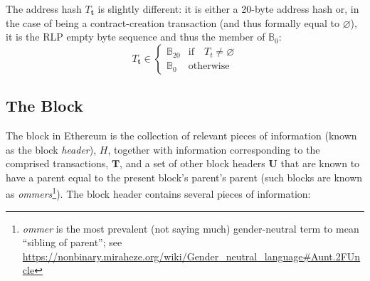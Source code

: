 \documentclass[9pt,oneside]{amsart}
\begin{document}
\begin{multicols}{2}
The address hash $T_\mathbf{t}$ is slightly different: it is either a 20-byte address hash or, in the case of being a contract-creation transaction (and thus formally equal to $\varnothing$), it is the RLP empty byte sequence and thus the member of $\mathbb{B}_0$:
\begin{equation}
T_\mathbf{t} \in \begin{cases} \mathbb{B}_{20} & \text{if} \quad T_t \neq \varnothing \\
\mathbb{B}_{0} & \text{otherwise}\end{cases}
\end{equation}

\subsection{The Block} \label{ch:block}

The block in Ethereum is the collection of relevant pieces of information (known as the block \textit{header}), $H$, together with information corresponding to the comprised transactions, $\mathbf{T}$, and a set of other block headers $\mathbf{U}$ that are known to have a parent equal to the present block's parent's parent (such blocks are known as \textit{ommers}\footnote{\textit{ommer} is the most prevalent (not saying much) gender-neutral term to mean ``sibling of parent''; see \url{https://nonbinary.miraheze.org/wiki/Gender_neutral_language\#Aunt.2FUncle}}). The block header contains several pieces of information:



\end{multicols}
\end{document}
